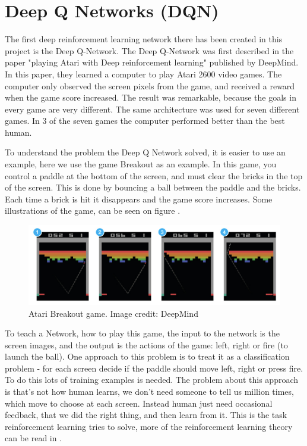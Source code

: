 \section{Deep Q Networks (DQN)}
\label{sec:DQN}
The first deep reinforcement learning network there has been created in this project is the Deep Q-Network. The Deep Q-Network was first described in the paper "playing Atari with Deep reinforcement learning" \cite{DBLP:journals/corr/MnihKSGAWR13} published by DeepMind. In this paper, they learned a computer to play Atari 2600 video games. The computer only observed the screen pixels from the game, and received a reward when the game score increased. The result was remarkable, because the goals in every game are very different. The same architecture was used for seven different games. In 3 of the seven games the computer performed better than the best human.  

To understand the problem the Deep Q Network solved, it is easier to use an example, here we use the game Breakout as an example. In this game, you control a paddle at the bottom of the screen, and must clear the bricks in the top of the screen. This is done by bouncing a ball between the paddle and the bricks. Each time a brick is hit it disappears and the game score increases. Some illustrations of the game, can be seen on figure .

\begin{figure}[H]
	\centering
	\includegraphics[width=1\textwidth]{Figures/Architecture/DQN/Atari_breakout.png}
	\caption{Atari Breakout game. Image credit: DeepMind\cite{DBLP:journals/corr/MnihKSGAWR13} }
	\label{fig:Atari_breakout}
\end{figure}

To teach a Network, how to play this game, the input to the network is the screen images, and the output is the actions of the game: left, right or fire (to launch the ball). One approach to this problem is to treat it as a classification problem - for each screen decide if the paddle should move left, right or press fire. To do this lots of training examples is needed. The problem about this approach is that’s not how human learns, we don't need someone to tell us million times, which move to choose at each screen. Instead human just need occasional feedback, that we did the right thing, and then learn from it. This is the task reinforcement learning tries to solve, more of the reinforcement learning theory can be read in . 

